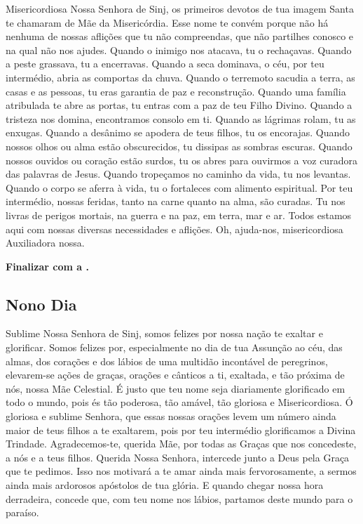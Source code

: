 \documentclass[a4paper,14pt]{extarticle} \usepackage[utf8]{inputenc}
\begin{document}
Misericordiosa Nossa Senhora de Sinj, os primeiros devotos de tua imagem Santa te chamaram de Mãe da Misericórdia. Esse nome te convém porque não há nenhuma de nossas aflições que tu não compreendas, que não partilhes conosco e na qual não nos ajudes. Quando o inimigo nos atacava, tu o rechaçavas. Quando a peste grassava, tu a encerravas. Quando a seca dominava, o céu, por teu intermédio, abria as comportas da chuva. Quando o terremoto sacudia a terra, as casas e as pessoas, tu eras garantia de paz e reconstrução. Quando uma família atribulada te abre as portas, tu entras com a paz de teu Filho Divino. Quando a tristeza nos domina, encontramos consolo em ti. Quando as lágrimas rolam, tu as enxugas. Quando a desânimo se apodera de teus filhos, tu os encorajas. Quando nossos olhos ou alma estão obscurecidos, tu dissipas as sombras escuras. Quando nossos ouvidos ou coração estão surdos, tu os abres para ouvirmos a voz curadora das palavras de Jesus. Quando tropeçamos no caminho da vida, tu nos levantas. Quando o corpo se aferra à vida, tu o fortaleces com alimento espiritual. Por teu intermédio, nossas feridas, tanto na carne quanto na alma, são curadas. Tu nos livras de perigos mortais, na guerra e na paz, em terra, mar e ar. Todos estamos aqui com nossas diversas necessidades e aflições. Oh, ajuda-nos, misericordiosa Auxiliadora nossa.

\noindent
\textbf{Finalizar com a .}


\subsection{Nono Dia}

Sublime Nossa Senhora de Sinj, somos felizes por nossa nação te exaltar e glorificar. Somos felizes por, especialmente no dia de tua Assunção ao céu, das almas, dos corações e dos lábios de uma multidão incontável de peregrinos, elevarem-se ações de graças, orações e cânticos a ti, exaltada, e tão próxima de nós, nossa Mãe Celestial. É justo que teu nome seja diariamente glorificado em todo o mundo, pois és tão poderosa, tão amável, tão gloriosa e Misericordiosa. Ó gloriosa e sublime Senhora, que essas nossas orações levem um número ainda maior de teus filhos a te exaltarem, pois por teu intermédio glorificamos a Divina Trindade. Agradecemos-te, querida Mãe, por todas as Graças que nos concedeste, a nós e a teus filhos. Querida Nossa Senhora, intercede junto a Deus pela Graça que te pedimos. Isso nos motivará a te amar ainda mais fervorosamente, a sermos ainda mais ardorosos apóstolos de tua glória. E quando chegar nossa hora derradeira, concede que, com teu nome nos lábios, partamos deste mundo para o paraíso.
\end{document}
